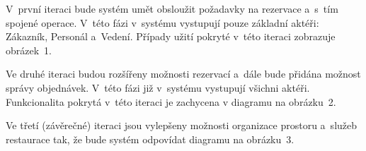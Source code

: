 \documentclass[a4paper,10pt]{article}
\begin{document}
V~první iteraci bude systém umět obsloužit požadavky na rezervace a~s~tím spojené operace. V~této fázi v~systému vystupují pouze základní aktéři: Zákazník, Personál a~Vedení.
Případy užití pokryté v~této iteraci zobrazuje obrázek~1.

Ve druhé iteraci budou rozšířeny možnosti rezervací a~dále bude přidána možnost správy objednávek. V~této fázi již v~systému vystupují všichni aktéři.
Funkcionalita pokrytá v~této iteraci je zachycena v diagramu na obrázku~2.

Ve třetí (závěrečné) iteraci jsou vylepšeny možnosti organizace prostoru a~služeb restaurace tak, že bude systém odpovídat diagramu na obrázku~3.

\begin{center}
\end{center}


\begin{landscape}	
\end{landscape}


\begin{landscape}	
\end{landscape}
\newpage




\end{document}
